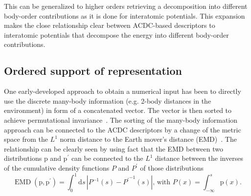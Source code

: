 This can be generalized to higher orders retrieving a decomposition into different body-order contributions as it is done for interatomic potentials.
This expansion makes the close relationship clear between ACDC-based descriptors to interatomic potentials that decompose the energy into different body-order contributions.

\subsection{Ordered support of representation}
One early-developed approach to obtain a numerical input has been to directly use the discrete many-body information (e.g. 2-body distances in the environment) in form of a concatenated vector.
The vector is then sorted to achieve permutational invariance~\cite{hansen2015machine, barker2016localized, huang2016communication}.
The sorting of the many-body information approach can be connected to the ACDC descriptors by a change of the metric space from the $L^1$ norm distance to the Earth mover's distance (EMD)~\cite{will+19jcp}.
The relationship can be clearly seen by using fact that the EMD between two distributions $\textrm{p}$ and $\textrm{p}^\prime$ can be connected to the $L^1$ distance between the inverses of the cumulative density functions $P$ and $P^\prime$ of those distributions
\begin{equation}
  \label{eq:emd_lp_duality}
  \operatorname{EMD}(\textrm{p}, \textrm{p}^\prime)=\int_0^1\mathrm{d}{s}\,\left|P^{-1}(s) -{P^{\prime}}^{-1}(s)\right|\text{, with }P(x)=\int_{-\infty}^s \textrm{p}(x).
\end{equation}
